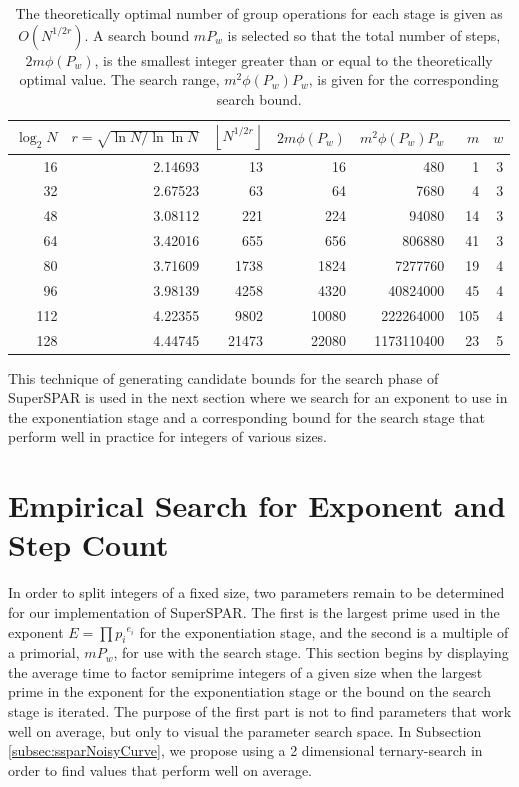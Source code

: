 \documentclass{ucalgthes1}
\theoremstyle{definition}
\newcommand{\floor}[1]{\left\lfloor #1 \right\rfloor}
\begin{document}
\begin{table}[htb]
\centering
\begin{tabular}{| r | r | r | r | r | r | r |}
\hline
$\log_2 N$ & $r = \sqrt{\ln N / \ln \ln N}$ & $\floor{N^{1/2r}}$ & $2m\phi(P_w)$ & $m^2\phi(P_w)P_w$ & $m$ & $w$ \\
\hline
16 & 2.14693 & 13 & 16 & 480 & 1 & 3 \\
32 & 2.67523 & 63 & 64 & 7680 & 4 & 3 \\
48 & 3.08112 & 221 & 224 & 94080 & 14 & 3 \\
64 & 3.42016 & 655 & 656 & 806880 & 41 & 3 \\
80 & 3.71609 & 1738 & 1824 & 7277760 & 19 & 4 \\
96 & 3.98139 & 4258 & 4320 & 40824000 & 45 & 4 \\
112 & 4.22355 & 9802 & 10080 & 222264000 & 105 & 4 \\
128 & 4.44745 & 21473 & 22080 & 1173110400 & 23 & 5 \\
\hline
\end{tabular}
\caption[Theoretical Number of Search Steps.]{The theoretically optimal number of group operations for each stage is given as $O(N^{1/2r})$.  A search bound $mP_w$ is selected so that the total number of steps, $2m\phi(P_w)$, is the smallest integer greater than or equal to the theoretically optimal value.  The search range, $m^2\phi(P_w)P_w$, is given for the corresponding search bound.}
\label{tab:theorySteps}
\end{table}

This technique of generating candidate bounds for the search phase of SuperSPAR is used in the next section where we search for an exponent to use in the exponentiation stage and a corresponding bound for the search stage that perform well in practice for integers of various sizes.  


\section{Empirical Search for Exponent and Step Count}
\label{sec:ssparEmpirical}

In order to split integers of a fixed size, two parameters remain to be determined for our implementation of SuperSPAR.  The first is the largest prime used in the exponent $E = \prod {p_i}^{e_i}$ for the exponentiation stage, and the second is a multiple of a primorial, $mP_w$, for use with the search stage.  This section begins by displaying the average time to factor semiprime integers of a given size when the largest prime in the exponent for the exponentiation stage or the bound on the search stage is iterated.  The purpose of the first part is not to find parameters that work well on average, but only to visual the parameter search space.  In Subsection \ref{subsec:ssparNoisyCurve}, we propose using a 2 dimensional ternary-search in order to find values that perform well on average. 
\end{document}
